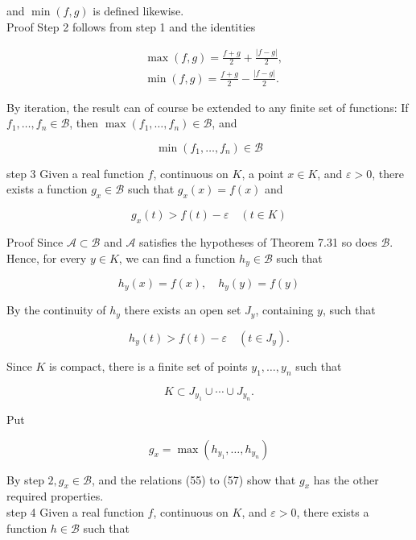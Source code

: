 \documentclass[10pt]{article}
\begin{document}
and $\min (f, g)$ is defined likewise.\\
Proof Step 2 follows from step 1 and the identities

$$
\begin{aligned}
& \max (f, g)=\frac{f+g}{2}+\frac{|f-g|}{2}, \\
& \min (f, g)=\frac{f+g}{2}-\frac{|f-g|}{2} .
\end{aligned}
$$

By iteration, the result can of course be extended to any finite set of functions: If $f_{1}, \ldots, f_{n} \in \mathscr{B}$, then $\max \left(f_{1}, \ldots, f_{n}\right) \in \mathscr{B}$, and

$$
\min \left(f_{1}, \ldots, f_{n}\right) \in \mathscr{B}
$$

step 3 Given a real function $f$, continuous on $K$, a point $x \in K$, and $\varepsilon>0$, there exists a function $g_{x} \in \mathscr{B}$ such that $g_{x}(x)=f(x)$ and


\begin{equation*}
g_{x}(t)>f(t)-\varepsilon \quad(t \in K) \tag{54}
\end{equation*}


Proof Since $\mathscr{A} \subset \mathscr{B}$ and $\mathscr{A}$ satisfies the hypotheses of Theorem 7.31 so does $\mathscr{B}$. Hence, for every $y \in K$, we can find a function $h_{y} \in \mathscr{B}$ such that


\begin{equation*}
h_{y}(x)=f(x), \quad h_{y}(y)=f(y) \tag{55}
\end{equation*}


By the continuity of $h_{y}$ there exists an open set $J_{y}$, containing $y$, such that


\begin{equation*}
h_{y}(t)>f(t)-\varepsilon \quad\left(t \in J_{y}\right) . \tag{56}
\end{equation*}


Since $K$ is compact, there is a finite set of points $y_{1}, \ldots, y_{n}$ such that


\begin{equation*}
K \subset J_{y_{1}} \cup \cdots \cup J_{y_{n}} . \tag{57}
\end{equation*}


Put

$$
g_{x}=\max \left(h_{y_{1}}, \ldots, h_{y_{n}}\right)
$$

By step $2, g_{x} \in \mathscr{B}$, and the relations (55) to (57) show that $g_{x}$ has the other required properties.\\
step 4 Given a real function $f$, continuous on $K$, and $\varepsilon>0$, there exists a function $h \in \mathscr{B}$ such that
\end{document}

